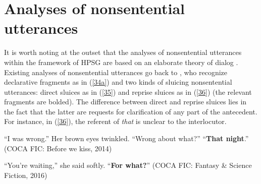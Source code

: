 \section{Analyses of nonsentential utterances}
\label{sec-analyses-of-NSUs}

It is worth noting at the outset that the analyses of nonsentential utterances within the framework of HPSG are based on an elaborate theory of dialog %
\citep{Ginzburg1994, Ginzburg2004, Ginzburg2014a, Larsson2002, Purver2006, Fernandez2006, Fernandez2002, Fernandez2007, Ginzburg2010, Ginzburg2014b, Ginzburg2012, Ginzburg2013, Kim2019}. Existing analyses of nonsentential utterances go back to \citet{Ginzburg:Sag:2000}, who recognize declarative fragments as in (\ref{34a}) and two kinds of sluicing nonsentential utterances: direct sluices as in (\ref{35}) and reprise sluices as  in (\ref{36}) (the relevant fragments are bolded). The difference between direct and reprise sluices lies in the fact that the latter are requests for clarification of any part of the antecedent. For instance, in (\ref{36}), the referent of \textit{that} is unclear to the interlocutor.

\ealnoraggedright
\ex ``I was wrong.'' Her brown eyes twinkled. ``Wrong about what?'' ``\textbf{That night}.'' (COCA FIC: Before we kiss, 2014) \label{34a}

\ex ``You're waiting,'' she said softly. ``\textbf{For what?}'' (COCA FIC: Fantasy \& Science Fiction, 2016) \label{35} 

